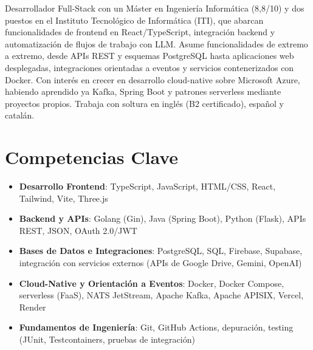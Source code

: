 \documentclass[11pt,a4paper,sans]{moderncv}
\begin{document}
\makecvtitle


\vspace{6pt}
\small{Desarrollador Full-Stack con un Máster en Ingeniería Informática (8,8/10) y dos puestos en el Instituto Tecnológico de Informática (ITI), que abarcan funcionalidades de frontend en React/TypeScript, integración backend y automatización de flujos de trabajo con LLM. Asume funcionalidades de extremo a extremo, desde APIs REST y esquemas PostgreSQL hasta aplicaciones web desplegadas, integraciones orientadas a eventos y servicios contenerizados con Docker. Con interés en crecer en desarrollo cloud-native sobre Microsoft Azure, habiendo aprendido ya Kafka, Spring Boot y patrones serverless mediante proyectos propios. Trabaja con soltura en inglés (B2 certificado), español y catalán.}


\section{Competencias Clave}
\vspace{1pt}
\begin{itemize}

\item \textbf{Desarrollo Frontend}: TypeScript, JavaScript, HTML/CSS, React, Tailwind, Vite, Three.js

\item \textbf{Backend y APIs}: Golang (Gin), Java (Spring Boot), Python (Flask), APIs REST, JSON, OAuth 2.0/JWT

\item \textbf{Bases de Datos e Integraciones}: PostgreSQL, SQL, Firebase, Supabase, integración con servicios externos (APIs de Google Drive, Gemini, OpenAI)

\item \textbf{Cloud-Native y Orientación a Eventos}: Docker, Docker Compose, serverless (FaaS), NATS JetStream, Apache Kafka, Apache APISIX, Vercel, Render

\item \textbf{Fundamentos de Ingeniería}: Git, GitHub Actions, depuración, testing (JUnit, Testcontainers, pruebas de integración)

\end{itemize}
\end{document}

